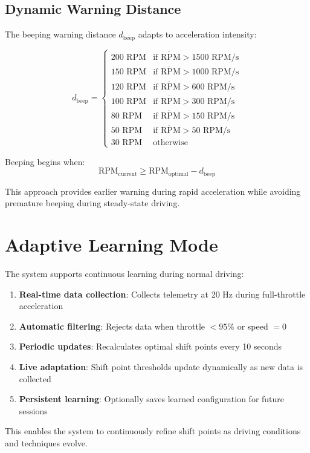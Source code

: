 \documentclass[12pt]{article}
\begin{document}
\subsection{Dynamic Warning Distance}

The beeping warning distance $d_{\text{beep}}$ adapts to acceleration intensity:

\begin{equation}
d_{\text{beep}} = \begin{cases}
200 \text{ RPM} & \text{if } \dot{\text{RPM}} > 1500 \text{ RPM/s} \\
150 \text{ RPM} & \text{if } \dot{\text{RPM}} > 1000 \text{ RPM/s} \\
120 \text{ RPM} & \text{if } \dot{\text{RPM}} > 600 \text{ RPM/s} \\
100 \text{ RPM} & \text{if } \dot{\text{RPM}} > 300 \text{ RPM/s} \\
80 \text{ RPM} & \text{if } \dot{\text{RPM}} > 150 \text{ RPM/s} \\
50 \text{ RPM} & \text{if } \dot{\text{RPM}} > 50 \text{ RPM/s} \\
30 \text{ RPM} & \text{otherwise}
\end{cases}
\end{equation}

Beeping begins when:
\begin{equation}
\text{RPM}_{\text{current}} \geq \text{RPM}_{\text{optimal}} - d_{\text{beep}}
\end{equation}

This approach provides earlier warning during rapid acceleration while avoiding premature beeping during steady-state driving.

\section{Adaptive Learning Mode}

The system supports continuous learning during normal driving:

\begin{enumerate}
    \item \textbf{Real-time data collection}: Collects telemetry at 20 Hz during full-throttle acceleration
    \item \textbf{Automatic filtering}: Rejects data when throttle $< 95\%$ or speed $= 0$
    \item \textbf{Periodic updates}: Recalculates optimal shift points every 10 seconds
    \item \textbf{Live adaptation}: Shift point thresholds update dynamically as new data is collected
    \item \textbf{Persistent learning}: Optionally saves learned configuration for future sessions
\end{enumerate}

This enables the system to continuously refine shift points as driving conditions and techniques evolve.
\end{document}
